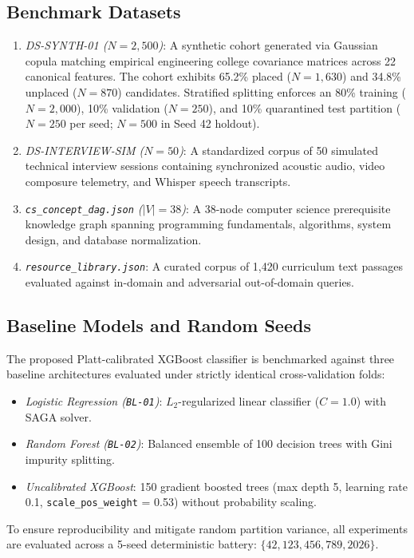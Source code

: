 \documentclass[conference]{IEEEtran}
\begin{document}
\subsection{Benchmark Datasets}
\begin{enumerate}
\item \textit{DS-SYNTH-01 ($N=2,500$)}: A synthetic cohort generated via Gaussian copula matching empirical engineering college covariance matrices across 22 canonical features. The cohort exhibits 65.2\% placed ($N=1,630$) and 34.8\% unplaced ($N=870$) candidates. Stratified splitting enforces an 80\% training ($N=2,000$), 10\% validation ($N=250$), and 10\% quarantined test partition ($N=250$ per seed; $N=500$ in Seed 42 holdout).
\item \textit{DS-INTERVIEW-SIM ($N=50$)}: A standardized corpus of 50 simulated technical interview sessions containing synchronized acoustic audio, video composure telemetry, and Whisper speech transcripts.
\item \textit{\texttt{cs\_concept\_dag.json} ($|V|=38$)}: A 38-node computer science prerequisite knowledge graph spanning programming fundamentals, algorithms, system design, and database normalization.
\item \textit{\texttt{resource\_library.json}}: A curated corpus of 1,420 curriculum text passages evaluated against in-domain and adversarial out-of-domain queries.
\end{enumerate}

\subsection{Baseline Models and Random Seeds}
The proposed Platt-calibrated XGBoost classifier is benchmarked against three baseline architectures evaluated under strictly identical cross-validation folds:
\begin{itemize}
\item \textit{Logistic Regression (\texttt{BL-01})}: $L_2$-regularized linear classifier ($C=1.0$) with SAGA solver.
\item \textit{Random Forest (\texttt{BL-02})}: Balanced ensemble of 100 decision trees with Gini impurity splitting.
\item \textit{Uncalibrated XGBoost}: 150 gradient boosted trees (max depth 5, learning rate 0.1, \texttt{scale\_pos\_weight} = 0.53) without probability scaling.
\end{itemize}
To ensure reproducibility and mitigate random partition variance, all experiments are evaluated across a 5-seed deterministic battery: $\{42, 123, 456, 789, 2026\}$.
\end{document}
